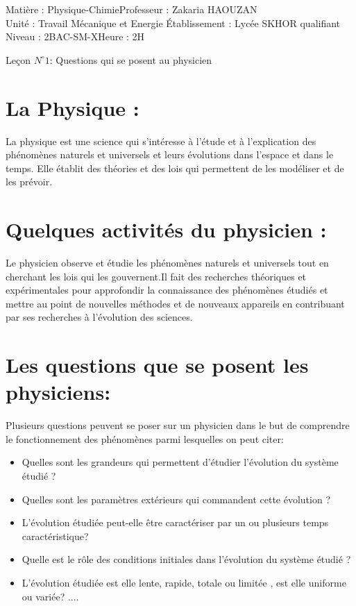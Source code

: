 \documentclass[12pt]{article}
\author{Zakaria HAOUZAN}
\date{\today}
\newcommand\headerMe[2]{\noindent{}#1\hfill#2}
\begin{document}
\headerMe{Matière : Physique-Chimie}{Professeur : Zakaria HAOUZAN}\\
\headerMe{Unité : Travail Mécanique et Energie }{Établissement : Lycée SKHOR qualifiant}\\
\headerMe{Niveau : 2BAC-SM-X}{Heure : 2H}\\

\begin{center}

    \Large{Leçon $N^{\circ} 1 $: \color{red} Questions qui se posent au physicien  }
\end{center}

\section{ La Physique :}
La physique est une science qui s'intéresse à l'étude et à l'explication des phénomènes naturels et universels et leurs
évolutions dans l'espace et dans le temps. Elle établit des théories et des lois qui permettent
de les modéliser et de les prévoir.

\section{ Quelques activités du physicien : }

Le physicien observe et étudie les phénomènes naturels et universels tout en cherchant les lois qui les gouvernent.Il
fait des recherches théoriques et expérimentales pour approfondir la connaissance des phénomènes étudiés et mettre
au point de nouvelles méthodes et de nouveaux appareils en contribuant par ses recherches à l'évolution des sciences.

\section{Les questions que se posent les physiciens: }
Plusieurs questions peuvent se poser sur un physicien dans le but de comprendre le fonctionnement des phénomènes
parmi lesquelles on peut citer:
\begin{itemize}
   \item Quelles sont les grandeurs qui permettent d'étudier l'évolution du système étudié ?
   \item Quelles sont les paramètres extérieurs qui commandent cette évolution ?
   \item L'évolution étudiée peut-elle être caractériser par un ou plusieurs temps caractéristique?
   \item Quelle est le rôle des conditions initiales dans l'évolution du système étudié ?
   \item L'évolution étudiée est elle lente, rapide, totale ou limitée , est elle uniforme ou variée? ....

\end{itemize}
\end{document}

